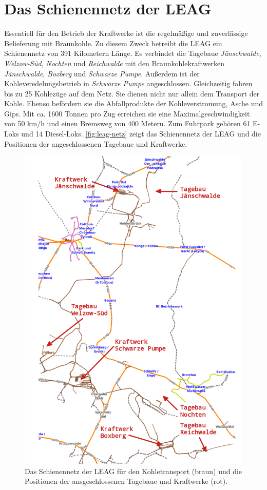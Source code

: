 \section{Das Schienennetz der LEAG}

Essentiell für den Betrieb der Kraftwerke ist die regelmäßige und zuverlässige Belieferung mit Braunkohle. Zu diesem Zweck betreibt die LEAG  ein Schienennetz von 391 Kilometern Länge\cite{hertzer_eisenbahner_2018}. Es verbindet die Tagebaue \emph{Jänschwalde}, \emph{Welzow-Süd}, \emph{Nochten} und \emph{Reichwalde} mit den Braunkohlekraftwerken \emph{Jänschwalde}, \emph{Boxberg} und \emph{Schwarze Pumpe}. Außerdem ist der Kohleveredelungsbetrieb in \emph{Schwarze Pumpe} angeschlossen\cite{noauthor_tagebau_2023}. Gleichzeitig fahren bis zu 25 Kohlezüge auf dem Netz. Sie dienen nicht nur allein dem Transport der Kohle. Ebenso befördern sie die Abfallprodukte der Kohleverstromung, Asche und Gips. Mit ca. 1600 Tonnen pro Zug erreichen sie eine Maximalgeschwindigkeit von 50 km/h und einen Bremsweg von 400 Metern. Zum Fuhrpark gehören 61 E-Loks und 14 Diesel-Loks\cite{hertzer_eisenbahner_2018}. \autoref{fig:leag-netz} zeigt das Schienennetz der LEAG und die Positionen der angeschlossenen Tagebaue und Kraftwerke.

\begin{figure}[!ht]
	\centering
	\includegraphics[width=0.75\linewidth]{images/LEAG-Netz-annotated.png}
	\caption{Das Schienennetz der LEAG für den Kohletransport (braun) und die Positionen der ansgeschlossenen Tagebaue und Kraftwerke (rot).}
	\label{fig:leag-netz}
\end{figure}